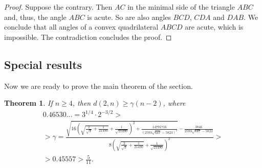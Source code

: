 \documentclass[a4paper,14pt]{article} %
\theoremstyle{plain}
\newtheorem{theorem}{Theorem}[section]
\theoremstyle{definition}
\begin{document}
\begin{proof}
	Suppose the contrary.
	Then $AC$ in the minimal side of the triangle $ABC$ and, thus, the angle $ABC$ is acute.
	So are also angles $BCD$, $CDA$ and $DAB$.
	We conclude that all angles of a convex quadrilateral $ABCD$ are acute, which is impossible.
	The contradiction concludes the proof.
\end{proof}

\subsection{Special results}

Now we are ready to prove the main theorem of the section.

\begin{theorem}
	\label{thm:main_estimate}
	If $n\geq 4$, then $d(2,n) \geq \gamma (n - 2)$,
	where
	\begin{multline}
		0.46530... =
		3^{1/4} \cdot 2^{-3/2} >
		\\ >
		\gamma = \frac{\sqrt{16 {{\left( \sqrt{\frac{2}{\sqrt{3}}+\frac{1}{21490}}+\frac{1}{\sqrt{21490}}\right) }^{2}}+\frac{14791716}{{{\left( 2593 \sqrt{647}-5823\right) }^{2}}}}-\frac{3846}{2593 \sqrt{647}-5823}}{8 {{\left( \sqrt{\frac{2}{\sqrt{3}}+\frac{1}{21490}}+\frac{1}{\sqrt{21490}}\right) }^{2}}}
		>\\
		> 0.45557
		> \frac{5}{11}
		.
	\end{multline}
\end{theorem}
\end{document}
